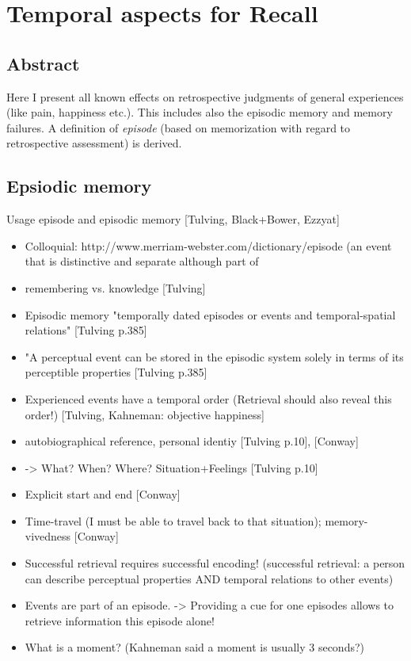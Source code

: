 \chapter{Temporal aspects for Recall}\label{chap:03}
\section*{Abstract}
Here I present all known effects on retrospective judgments of general experiences (like pain, happiness etc.).
This includes also the episodic memory and memory failures.
A definition of \emph{episode} (based on memorization with regard to retrospective assessment) is derived.

\section{Epsiodic memory}
Usage episode and episodic memory [Tulving, Black+Bower, Ezzyat]
\begin{itemize}
\item Colloquial:  http://www.merriam-webster.com/dictionary/episode (an event that is distinctive and separate although part of \item remembering vs. knowledge [Tulving]

\item Episodic memory "temporally dated episodes or events and temporal-spatial relations" [Tulving p.385]
\item "A perceptual event can be stored in the episodic system solely in terms of its perceptible properties [Tulving p.385]
\item Experienced events have a temporal order (Retrieval should also reveal this order!) [Tulving, Kahneman: objective happiness]

\item autobiographical reference, personal identiy [Tulving p.10], [Conway]
\item -> What? When? Where? Situation+Feelings [Tulving p.10]
\item Explicit start and end [Conway]
\item Time-travel (I must be able to travel back to that situation); memory-vivedness [Conway]
      
\item Successful retrieval requires successful encoding! (successful retrieval: a person can describe perceptual properties AND temporal relations to other events)

\item Events are part of an episode. -> Providing a cue for one episodes allows to retrieve information this episode alone!
\item What is a moment? (Kahneman said a moment is usually 3 seconds?)
\end{itemize}


